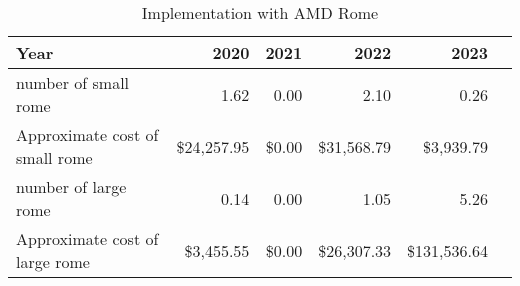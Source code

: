 \tiny \begin{longtable} { |p{}  |r  |r  |r  |r  |r |} 
\caption{Implementation with AMD Rome \label{tab:Rome}}\\ 
\hline 
\textbf{Year}&\textbf{2020}&\textbf{2021}&\textbf{2022}&\textbf{2023} \\ \hline
{number of small rome }&{1.62}&{0.00}&{2.10}&{0.26} \\ \hline
{Approximate cost of small rome }&{\$24,257.95}&{\$0.00}&{\$31,568.79}&{\$3,939.79} \\ \hline
{number of large rome }&{0.14}&{0.00}&{1.05}&{5.26} \\ \hline
{Approximate cost of large rome }&{\$3,455.55}&{\$0.00}&{\$26,307.33}&{\$131,536.64} \\ \hline
\end{longtable} \normalsize
